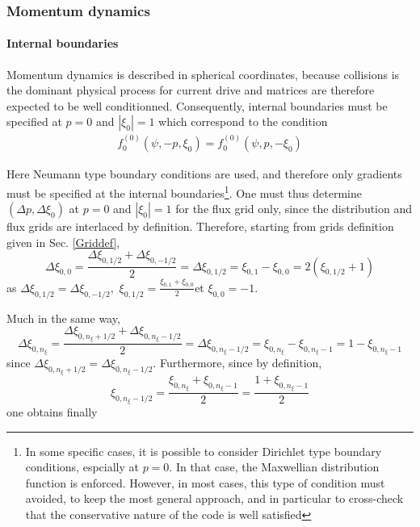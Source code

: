 
\label{FPboundaries}\subsubsection{Momentum dynamics}

\paragraph{Internal boundaries}

Momentum dynamics is described in spherical coordinates, because collisions
is the dominant physical process for current drive and matrices are
therefore expected to be well conditionned. Consequently, internal
boundaries must be specified at $p=0$ and $\left| \xi _{0}\right| =1$ which
correspond to the condition
\begin{equation}
\begin{array}{l}
f_{0}^{\left( 0\right) }\left( \psi ,-p,\xi _{0}\right) =f_{0}^{\left(
0\right) }\left( \psi ,p,-\xi _{0}\right)
\end{array}
\end{equation}

Here Neumann type boundary conditions are used, and therefore only gradients
must be specified at the internal boundaries\footnote{%
In some specific cases, it is possible to consider Dirichlet type boundary
conditions, espcially at $p=0$. In that case, the Maxwellian distribution
function is enforced. However, in most cases, this type of condition must
avoided, to keep the most general approach, and in particular to cross-check
that the conservative nature of the code is well satisfied}. One must thus
determine $\left( \Delta p,\Delta \xi _{0}\right) $ at $p=0$ and $\left| \xi
_{0}\right| =1$ for the flux grid only, since the distribution and flux
grids are interlaced by definition. Therefore, starting from grids
definition given in Sec. \ref{Griddef},
\begin{equation}
\Delta \xi _{0,0}=\frac{\Delta \xi _{0,1/2}+\Delta \xi _{0,-1/2}}{2}=\Delta %
\xi _{0,1/2}=\xi _{0,1}-\xi _{0,0}=2\left( \xi _{0,1/2}+1\right)
\end{equation}
as $\Delta \xi _{0,1/2}=\Delta \xi _{0,-1/2},$ $\xi _{0,1/2}=\frac{\xi
_{0,1}+\xi _{0,0}}{2}$et $\xi _{0,0}=-1.$

Much in the same way,
\begin{equation}
\Delta \xi _{0,n_{\xi }}=\frac{\Delta \xi _{0,n_{\xi }+1/2}+\Delta \xi
_{0,n_{\xi }-1/2}}{2}=\Delta \xi _{0,n_{\xi }-1/2}=\xi _{0,n_{\xi }}-\xi
_{0,n_{\xi }-1}=1-\xi _{0,n_{\xi }-1}
\end{equation}
since $\Delta \xi _{0,n_{\xi }+1/2}=\Delta \xi _{0,n_{\xi }-1/2}.$
Furthermore, since by definition,
\begin{equation}
\xi _{0,n_{\xi }-1/2}=\frac{\xi _{0,n_{\xi }}+\xi _{0,n_{\xi }-1}}{2}=\frac{
1+\xi _{0,n_{\xi }-1}}{2}
\end{equation}
one obtains finally

